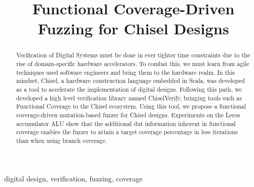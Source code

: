 \documentclass[conference]{IEEEtran}
\newcommand{\todo}[1]{{\color{olive} TODO: #1}}
\newcommand{\martin}[1]{{\color{blue} Martin: #1}}
\begin{document}

\title{Functional Coverage-Driven Fuzzing for Chisel Designs}

\author{


}


\maketitle \thispagestyle{empty}

\begin{abstract}

Verification of Digital Systems must be done in ever tighter time constraints due to the rise of domain-specific hardware accelerators.
To combat this, we must learn from agile techniques used software engineers and bring them to the hardware realm.
In this mindset, Chisel, a hardware construction language embedded in Scala, was developed as a tool to accelerate the implementation of digital designs.
Following this path, we developed a high level verification library named ChiselVerify, bringing tools such as Functional Coverage to the Chisel ecosystem.
Using this tool, we propose a functional coverage-driven mutation-based fuzzer for Chisel designs.
Experiments on the Leros accumulator ALU show that the additional dut information inherent in functional coverage enables the fuzzer to attain a target coverage percentage in less iterations than when using branch coverage.

\end{abstract}

\begin{IEEEkeywords}
digital design, verification, fuzzing, coverage
\end{IEEEkeywords}
%
%
\end{document}
